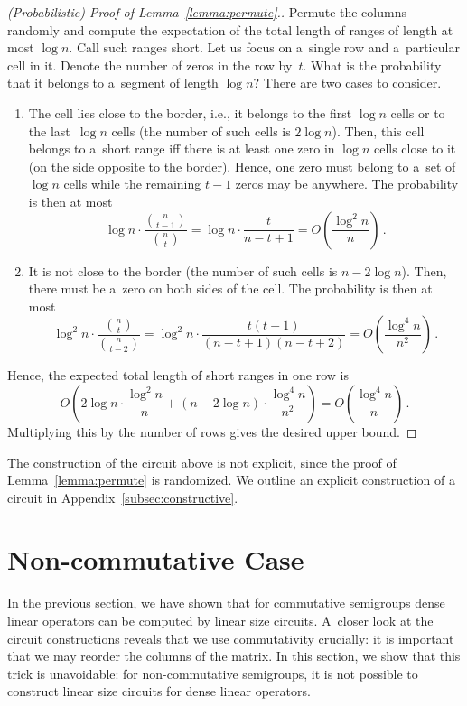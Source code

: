 \documentclass[11pt,letterpaper]{article}
\begin{document}
\begin{proof}[(Probabilistic) Proof of Lemma~\ref{lemma:permute}.]
Permute the columns randomly and compute the expectation of
the total length of ranges of length at most $\log n$. Call such ranges short. Let us focus on a~single row and a~particular cell in it. Denote the number of zeros in the row by~$t$. What is the probability that it belongs to a~segment of length $\log n$? There are two cases to consider.
\begin{enumerate}
\item The cell lies close to the border, i.e., it belongs to
the first $\log n$ cells or to the last~$\log n$ cells
(the number of such cells is $2\log n$). Then,
this cell belongs to a~short range iff there is at least one zero
in $\log n$ cells close to it (on the side opposite to the border).
Hence, one zero must belong to a~set of $\log n$ cells while the remaining $t-1$ zeros may be anywhere.
The probability is then at most
\[\log n \cdot \frac{\binom{n}{t-1}}{\binom{n}{t}}=\log n \cdot \frac{t}{n-t+1}=O\left(\frac{\log^2n}{n}\right) \, .\]
\item It is not close to the border (the number of such cells is $n-2\log n$). Then, there must be a~zero on both sides of the
cell. The probability is then at most
\[\log^2 n \cdot \frac{\binom{n}{t}}{\binom{n}{t-2}}=\log^2n \cdot \frac{t(t-1)}{(n-t+1)(n-t+2)}=O\left(\frac{\log^4 n}{n^2}\right) \, .\]
\end{enumerate}
Hence, the expected total length of short ranges in one row is
\[O\left( 2\log n \cdot \frac{\log^2 n}{n} + (n-2\log n) \cdot \frac{\log^4 n}{n^2}\right)=O\left(\frac{\log^4 n}{n}\right) \, .\]
Multiplying this by the number of rows gives the desired upper bound.
\end{proof}

The construction of the circuit above is not explicit, since the proof of Lemma~\ref{lemma:permute} is randomized. We outline an explicit construction of a circuit in Appendix~\ref{subsec:constructive}.


\section{Non-commutative Case}\label{sec-non-commutative}

In the previous section, we have shown that for commutative semigroups dense linear operators can be computed by linear size circuits. A~closer look at the circuit constructions reveals that we use commutativity crucially: it is important that we may reorder the columns of the matrix. In this section, we show that this trick is unavoidable: for non-commutative semigroups, it is not possible to construct linear size circuits for dense linear operators.
\end{document}
